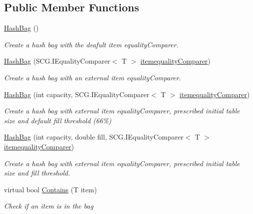 \subsection*{Public Member Functions}
\begin{DoxyCompactItemize}
\item 
\hyperlink{class_c5_1_1_hash_bag_a1f2efb2a869ab3cd1cc401044cfb4cdd}{Hash\+Bag} ()
\begin{DoxyCompactList}\small\item\em Create a hash bag with the deafult item equality\+Comparer. \end{DoxyCompactList}\item 
\hyperlink{class_c5_1_1_hash_bag_a2fd8c54c9f9e6117f6a8e4ae44b313a6}{Hash\+Bag} (S\+C\+G.\+I\+Equality\+Comparer$<$ T $>$ \hyperlink{class_c5_1_1_collection_base_a95e343400be0e8f3f8d6310f1aaf2cc6}{itemequality\+Comparer})
\begin{DoxyCompactList}\small\item\em Create a hash bag with an external item equality\+Comparer. \end{DoxyCompactList}\item 
\hyperlink{class_c5_1_1_hash_bag_aa2aa8a755891286b58745f230acece7d}{Hash\+Bag} (int capacity, S\+C\+G.\+I\+Equality\+Comparer$<$ T $>$ \hyperlink{class_c5_1_1_collection_base_a95e343400be0e8f3f8d6310f1aaf2cc6}{itemequality\+Comparer})
\begin{DoxyCompactList}\small\item\em Create a hash bag with external item equality\+Comparer, prescribed initial table size and default fill threshold (66\%) \end{DoxyCompactList}\item 
\hyperlink{class_c5_1_1_hash_bag_ae33cec1625f2527407e5a55946b35b6b}{Hash\+Bag} (int capacity, double fill, S\+C\+G.\+I\+Equality\+Comparer$<$ T $>$ \hyperlink{class_c5_1_1_collection_base_a95e343400be0e8f3f8d6310f1aaf2cc6}{itemequality\+Comparer})
\begin{DoxyCompactList}\small\item\em Create a hash bag with external item equality\+Comparer, prescribed initial table size and fill threshold. \end{DoxyCompactList}\item 
virtual bool \hyperlink{class_c5_1_1_hash_bag_a4ab198cd099f684fc161c4055106c2a8}{Contains} (T item)
\begin{DoxyCompactList}\small\item\em Check if an item is in the bag \end{DoxyCompactList}\item 

\end{DoxyCompactItemize}
